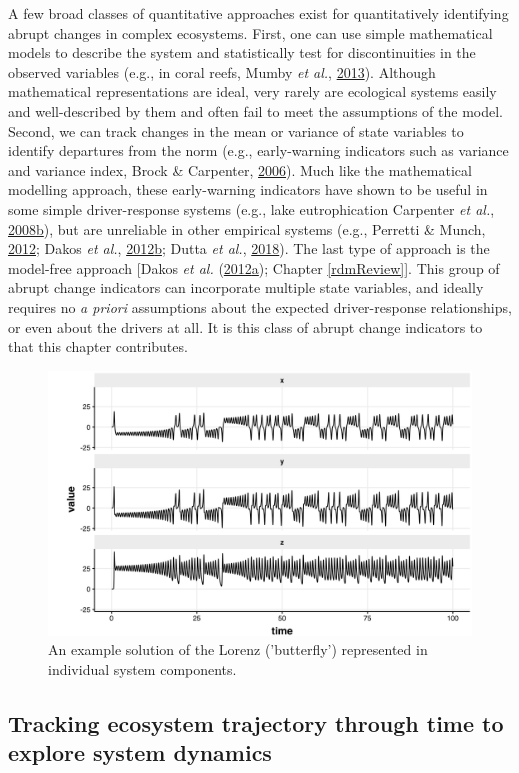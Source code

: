 \documentclass[print]{nuthesis}
\begin{document}
A few broad classes of quantitative approaches exist for quantitatively identifying abrupt changes in complex ecosystems. First, one can use simple mathematical models to describe the system and statistically test for discontinuities in the observed variables (e.g., in coral reefs, Mumby \emph{et al.}, \protect\hyperlink{ref-mumby2013evidence}{2013}). Although mathematical representations are ideal, very rarely are ecological systems easily and well-described by them and often fail to meet the assumptions of the model. Second, we can track changes in the mean or variance of state variables to identify departures from the norm (e.g., early-warning indicators such as variance and variance index, Brock \& Carpenter, \protect\hyperlink{ref-brock_variance_2006}{2006}). Much like the mathematical modelling approach, these early-warning indicators have shown to be useful in some simple driver-response systems (e.g., lake eutrophication Carpenter \emph{et al.}, \protect\hyperlink{ref-carpenter_leading_2008}{2008}\protect\hyperlink{ref-carpenter_leading_2008}{b}), but are unreliable in other empirical systems (e.g., Perretti \& Munch, \protect\hyperlink{ref-perretti2012regime}{2012}; Dakos \emph{et al.}, \protect\hyperlink{ref-dakos2012robustness}{2012}\protect\hyperlink{ref-dakos2012robustness}{b}; Dutta \emph{et al.}, \protect\hyperlink{ref-dutta2018robustness}{2018}). The last type of approach is the model-free approach {[}Dakos \emph{et al.} (\protect\hyperlink{ref-dakos2012methods}{2012}\protect\hyperlink{ref-dakos2012methods}{a}); Chapter \ref{rdmReview}{]}. This group of abrupt change indicators can incorporate multiple state variables, and ideally requires no \emph{a priori} assumptions about the expected driver-response relationships, or even about the drivers at all. It is this class of abrupt change indicators to that this chapter contributes.
\begin{figure}
\includegraphics[width=0.85\linewidth]{./chapterFiles/velocity/figsCalledInDiss/lorenz3D_timeseries} \caption{An example solution of the Lorenz ('butterfly') represented in individual system components.}\label{fig:lorenz3Dts}
\end{figure}
\hypertarget{tracking-ecosystem-trajectory-through-time-to-explore-system-dynamics}{%
\subsection{Tracking ecosystem trajectory through time to explore system dynamics}\label{tracking-ecosystem-trajectory-through-time-to-explore-system-dynamics}}
\end{document}
